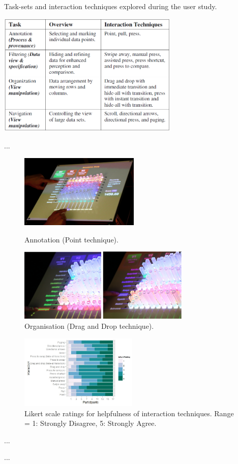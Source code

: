 \documentclass[11pt]{article}
\begin{document}
\begin{table}[H]
\centering
\caption{Task-sets and interaction techniques explored during the user study.}\label{tbl:taher2015-user-study}
\includegraphics[width=0.65\textwidth]{img/taher2015-user-study.png} 
\end{table}

...

\begin{figure}[H]
\centering
  \includegraphics[height=3.5cm]{img/taher2015-annotation.png}
  \caption{Annotation (Point technique).}\label{fig:taher2015-annotation}
\endminipage\hfill
{}%
\centering
  \includegraphics[height=3.5cm]{img/taher2015-organize.png}
  \caption{Organisation (Drag and Drop technique).}\label{fig:taher2015-organize}
\endminipage
\end{figure}

\begin{figure}[H]
\centering
\includegraphics[width=0.5\textwidth]{img/taher2015-likert.png} 
\caption{Likert scale ratings for helpfulness of interaction
techniques. Range = 1: Strongly Disagree, 5: Strongly Agree.}\label{fig:taher2015-likert}
\end{figure}

...

...


\newpage
\small

\normalsize
\end{document}
